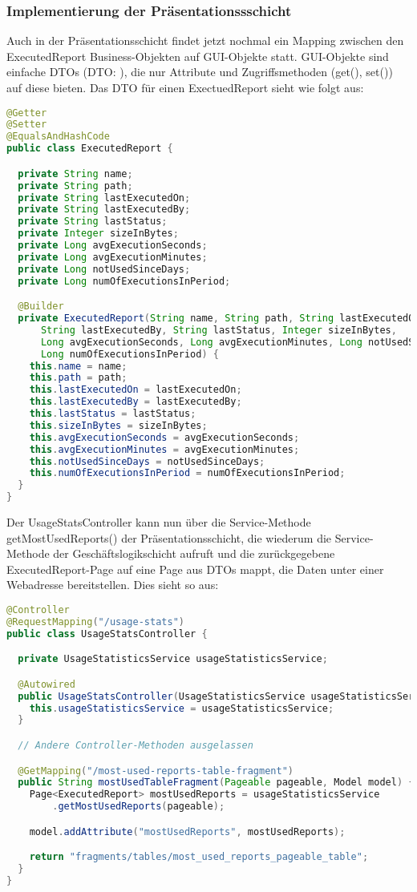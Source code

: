 \subsubsection{Implementierung der Präsentationssschicht}
\label{sec:ImplementierungPraesentationsschicht}
Auch in der Präsentationsschicht findet jetzt nochmal ein Mapping zwischen den ExecutedReport Business-Objekten auf \ac{GUI}-Objekte statt. \ac{GUI}-Objekte sind einfache \acs{DTO}s (\acs{DTO}: ), die nur Attribute und Zugriffsmethoden (get(), set()) auf diese bieten. Das \ac{DTO} für einen ExectuedReport sieht wie folgt aus:
\begin{lstlisting}[language=Java,caption={ExecutedReport-DTO}]
@Getter
@Setter
@EqualsAndHashCode
public class ExecutedReport {

  private String name;
  private String path;
  private String lastExecutedOn;
  private String lastExecutedBy;
  private String lastStatus;
  private Integer sizeInBytes;
  private Long avgExecutionSeconds;
  private Long avgExecutionMinutes;
  private Long notUsedSinceDays;
  private Long numOfExecutionsInPeriod;

  @Builder
  private ExecutedReport(String name, String path, String lastExecutedOn,
      String lastExecutedBy, String lastStatus, Integer sizeInBytes,
      Long avgExecutionSeconds, Long avgExecutionMinutes, Long notUsedSinceDays,
      Long numOfExecutionsInPeriod) {
    this.name = name;
    this.path = path;
    this.lastExecutedOn = lastExecutedOn;
    this.lastExecutedBy = lastExecutedBy;
    this.lastStatus = lastStatus;
    this.sizeInBytes = sizeInBytes;
    this.avgExecutionSeconds = avgExecutionSeconds;
    this.avgExecutionMinutes = avgExecutionMinutes;
    this.notUsedSinceDays = notUsedSinceDays;
    this.numOfExecutionsInPeriod = numOfExecutionsInPeriod;
  }
}
\end{lstlisting}
Der UsageStatsController kann nun über die Service-Methode getMostUsedReports() der Präsentationsschicht, die wiederum die Service-Methode der Geschäftslogikschicht aufruft und die zurückgegebene ExecutedReport-Page auf eine Page aus \ac{DTO}s mappt, die Daten unter einer Webadresse bereitstellen. Dies sieht so aus:
\begin{lstlisting}[language=Java,caption={UsageStatsController}]
@Controller
@RequestMapping("/usage-stats")
public class UsageStatsController {

  private UsageStatisticsService usageStatisticsService;

  @Autowired
  public UsageStatsController(UsageStatisticsService usageStatisticsService) {
    this.usageStatisticsService = usageStatisticsService;
  }

  // Andere Controller-Methoden ausgelassen

  @GetMapping("/most-used-reports-table-fragment")
  public String mostUsedTableFragment(Pageable pageable, Model model) {
    Page<ExecutedReport> mostUsedReports = usageStatisticsService
        .getMostUsedReports(pageable);

    model.addAttribute("mostUsedReports", mostUsedReports);

    return "fragments/tables/most_used_reports_pageable_table";
  }
}
\end{lstlisting}
